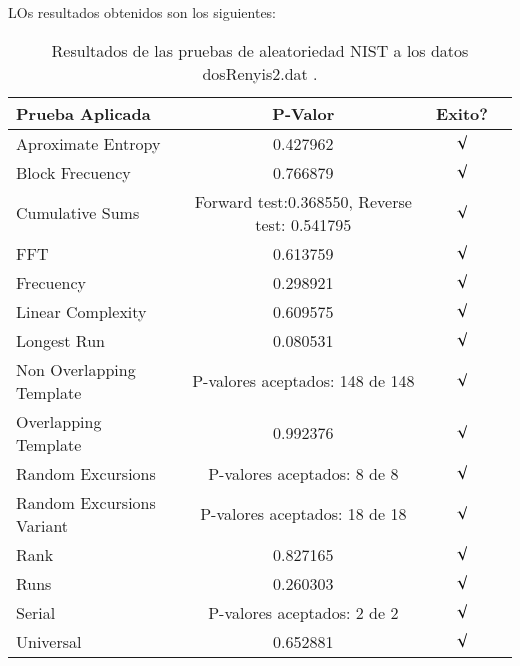 \documentclass[12pt,3p]{elsarticle}
\begin{document}
LOs resultados obtenidos son los siguientes:

 

\begin{table}[H]
\caption{Resultados de las pruebas de aleatoriedad NIST a los datos dosRenyis2.dat .}
\label{sample-table}
\vskip 0.15in
\begin{center}
\begin{small}
\begin{sc}
\begin{tabular}{lccr}
\hline

Prueba Aplicada &  P-Valor & Exito? \\
\hline

Aproximate Entropy    &   0.427962 & $\surd$ \\

Block Frecuency  &   0.766879  &  $\surd$  \\

Cumulative Sums    &   Forward test:0.368550, Reverse test: 0.541795  & $\surd$ \\

FFT    &   0.613759 &   $\surd$      \\

Frecuency     &  0.298921 &  $\surd$   \\

Linear Complexity      &  0.609575 & $\surd$ \\

Longest Run      &  0.080531 &    $\surd$      \\

Non Overlapping Template      & P-valores aceptados: 148 de 148    &     $\surd$          \\

Overlapping Template      &  0.992376  &        $\surd$       \\

Random Excursions      & P-valores aceptados:  8 de 8  &    $\surd$      \\

Random Excursions Variant & P-valores aceptados:  18 de 18 &     $\surd$    \\

Rank &    0.827165  &      $\surd$      \\

Runs &    0.260303 &     $\surd$        \\

Serial &     P-valores aceptados: 2 de 2    &     $\surd$        \\

Universal &      0.652881 &   $\surd$            \\

\hline



\end{tabular}
\end{sc}
\end{small}
\end{center}
\vskip -0.1in
\end{table}
\end{document}
